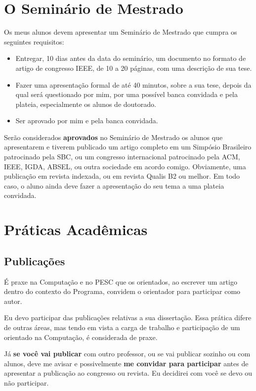 \documentclass{book}
\begin{document}
\chapter{O Seminário de Mestrado}

Os meus alunos devem apresentar um Seminário de Mestrado que cumpra os seguintes requisitos:
\begin{itemize}
    \item Entregar, 10 dias antes da data do seminário, um documento no formato de artigo de congresso IEEE, de 10 a 20 páginas, com uma descrição de sua tese.
    \item Fazer uma apresentação formal de até 40 minutos, sobre a sua tese, depois da qual será questionado por mim, por uma possível banca convidada e pela plateia, especialmente os alunos de doutorado.
    \item Ser aprovado por mim e pela banca convidada.
\end{itemize}

Serão considerados \textbf{aprovados} no Seminário de Mestrado os alunos que apresentarem e tiverem publicado um artigo completo em um Simpósio Brasileiro patrocinado pela SBC, ou um congresso internacional patrocinado pela ACM, IEEE, IGDA, ABSEL, ou outra sociedade em acordo comigo. Obviamente, uma publicação em revista indexada, ou em revista Qualis B2 ou melhor. Em todo caso, o aluno ainda deve fazer a apresentação do seu tema a uma plateia convidada.

\chapter{Práticas Acadêmicas}

\section{Publicações}

É praxe na Computação e no PESC que os orientados, ao escrever um artigo dentro do contexto do Programa, convidem o orientador para participar como autor. 

Eu devo participar das publicações relativas a sua dissertação. Essa prática difere de outras áreas, mas tendo em vista a carga de trabalho e participação de um orientado na Computação, é considerada de praxe. 

Já \textbf{se você vai publicar} com outro professor, ou se vai publicar sozinho ou com alunos, deve me avisar e possivelmente \textbf{me convidar para participar} antes de apresentar a publicação ao congresso ou revista. Eu decidirei com você se devo ou não participar. 
\end{document}
